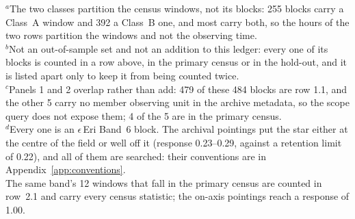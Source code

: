 {\footnotesize\raggedright $^{a}$The two classes partition the census windows, not its blocks: 255 blocks carry a Class~A window and 392 a Class~B one, and most carry both, so the hours of the two rows partition the windows and not the observing time.\\ $^{b}$Not an out-of-sample set and not an addition to this ledger: every one of its blocks is counted in a row above, in the primary census or in the hold-out, and it is listed apart only to keep it from being counted twice.\\ $^{c}$Panels 1 and 2 overlap rather than add: 479 of these 484 blocks are row 1.1, and the other 5 carry no member observing unit in the archive metadata, so the scope query does not expose them; 4 of the 5 are in the primary census.\\ $^{d}$Every one is an $\epsilon$\,Eri Band~6 block. The archival pointings put the star either at the centre of the field or well off it (response 0.23--0.29, against a retention limit of 0.22), and all of them are searched: their conventions are in Appendix~\ref{app:conventions}.\\ The same band's 12 windows that fall in the primary census are counted in row~2.1 and carry every census statistic; the on-axis pointings reach a response of 1.00.}

